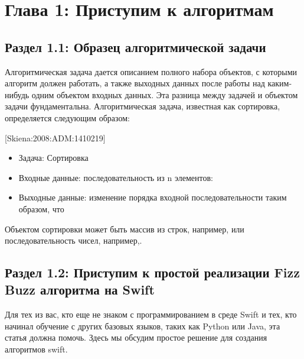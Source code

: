 
\chapter*{Глава 1: Приступим к алгоритмам}
\section*{Раздел 1.1: Образец алгоритмической задачи}

Алгоритмическая задача дается описанием полного набора объектов, с которыми алгоритм должен работать, а также выходных данных после работы над каким-нибудь одним объектом входных данных. Эта разница между задачей и объектом задачи фундаментальна. Алгоритмическая задача, известная как сортировка, определяется следующим образом: 

[Skiena:2008:ADM:1410219]
\begin{itemize}
\item Задача: Сортировка
\item Входные данные: последовательность из n элементов: 
\item Выходные данные: изменение порядка входной последовательности таким образом, что  
\end{itemize}

Объектом сортировки  может быть массив из строк, например,   или последовательность чисел, например,\tcbox[nobeforeafter, tcbox raise base,top=0.1mm,bottom=0.1mm, right=0.1mm, left=0.1mm]{\{ \textcolor{Purple}{154}, \textcolor{Purple}{245}, \textcolor{Purple}{1337} \}}. 

\section*{Раздел 1.2: Приступим к простой реализации Fizz Buzz алгоритма на Swift}

Для тех из вас, кто еще не знаком с программированием в среде Swift и тех, кто начинал обучение с других базовых языков, таких как Python или Java, эта статья должна помочь. Здесь мы обсудим простое решение для создания алгоритмов swift.

